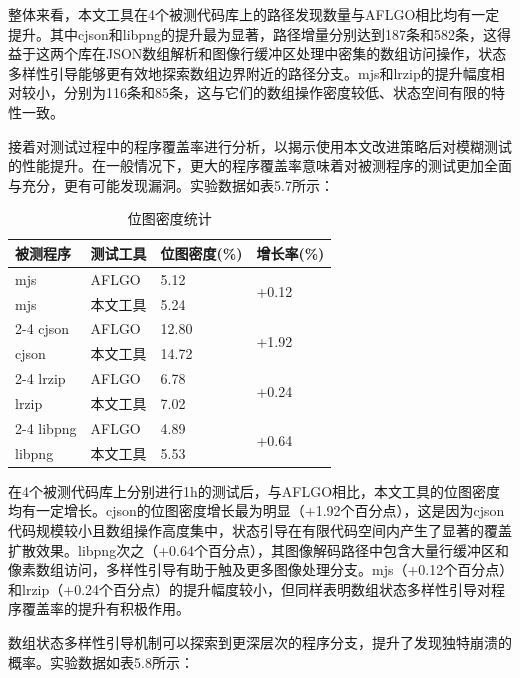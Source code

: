 \documentclass[bachelor]{njupthesis}
\begin{document}
整体来看，本文工具在4个被测代码库上的路径发现数量与AFLGO相比均有一定提升。其中cjson和libpng的提升最为显著，路径增量分别达到187条和582条，这得益于这两个库在JSON数组解析和图像行缓冲区处理中密集的数组访问操作，状态多样性引导能够更有效地探索数组边界附近的路径分支。mjs和lrzip的提升幅度相对较小，分别为116条和85条，这与它们的数组操作密度较低、状态空间有限的特性一致。

接着对测试过程中的程序覆盖率进行分析，以揭示使用本文改进策略后对模糊测试的性能提升。在一般情况下，更大的程序覆盖率意味着对被测程序的测试更加全面与充分，更有可能发现漏洞。实验数据如表5.7所示：

\begin{table}[hbt]
\centering
\caption{位图密度统计}
\label{tab:coverage}
\begin{tabular}{llll}
\toprule
\textbf{被测程序} & \textbf{测试工具} & \textbf{位图密度(\%)} & \textbf{增长率(\%)} \\
\midrule
mjs & AFLGO & 5.12 & \multirow{2}{*}{+0.12} \\
mjs & 本文工具 & 5.24 & \\
\cmidrule(lr){2-4}
cjson & AFLGO & 12.80 & \multirow{2}{*}{+1.92} \\
cjson & 本文工具 & 14.72 & \\
\cmidrule(lr){2-4}
lrzip & AFLGO & 6.78 & \multirow{2}{*}{+0.24} \\
lrzip & 本文工具 & 7.02 & \\
\cmidrule(lr){2-4}
libpng & AFLGO & 4.89 & \multirow{2}{*}{+0.64} \\
libpng & 本文工具 & 5.53 & \\
\bottomrule
\end{tabular}
\end{table}

在4个被测代码库上分别进行1h的测试后，与AFLGO相比，本文工具的位图密度均有一定增长。cjson的位图密度增长最为明显（+1.92个百分点），这是因为cjson代码规模较小且数组操作高度集中，状态引导在有限代码空间内产生了显著的覆盖扩散效果。libpng次之（+0.64个百分点），其图像解码路径中包含大量行缓冲区和像素数组访问，多样性引导有助于触及更多图像处理分支。mjs（+0.12个百分点）和lrzip（+0.24个百分点）的提升幅度较小，但同样表明数组状态多样性引导对程序覆盖率的提升有积极作用。

数组状态多样性引导机制可以探索到更深层次的程序分支，提升了发现独特崩溃的概率。实验数据如表5.8所示：
\end{document}
